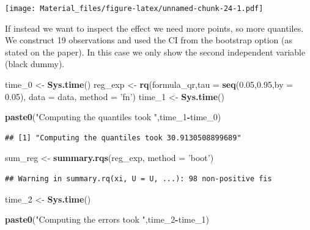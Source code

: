 \documentclass[]{book}
\newenvironment{Shaded}{\begin{snugshade}}{\end{snugshade}}
\newcommand{\KeywordTok}[1]{\textcolor[rgb]{0.13,0.29,0.53}{\textbf{#1}}}
\newcommand{\DataTypeTok}[1]{\textcolor[rgb]{0.13,0.29,0.53}{#1}}
\newcommand{\DecValTok}[1]{\textcolor[rgb]{0.00,0.00,0.81}{#1}}
\newcommand{\FloatTok}[1]{\textcolor[rgb]{0.00,0.00,0.81}{#1}}
\newcommand{\StringTok}[1]{\textcolor[rgb]{0.31,0.60,0.02}{#1}}
\newcommand{\OperatorTok}[1]{\textcolor[rgb]{0.81,0.36,0.00}{\textbf{#1}}}
\newcommand{\NormalTok}[1]{#1}
\begin{document}
\texttt{[image: Material\_files/figure-latex/unnamed-chunk-24-1.pdf]}

If instead we want to inspect the effect we need more points, so more
quantiles. We construct 19 observations and used the CI from the
bootstrap option (as stated on the paper). In this case we only show the
second independent variable (black dummy).

\begin{Shaded}
\begin{Highlighting}[]
\NormalTok{time_}\DecValTok{0}\NormalTok{ <-}\StringTok{ }\KeywordTok{Sys.time}\NormalTok{()}
\NormalTok{reg_exp <-}\StringTok{ }\KeywordTok{rq}\NormalTok{(formula_qr,}\DataTypeTok{tau =} \KeywordTok{seq}\NormalTok{(}\FloatTok{0.05}\NormalTok{,}\FloatTok{0.95}\NormalTok{,}\DataTypeTok{by =} \FloatTok{0.05}\NormalTok{), }\DataTypeTok{data =}\NormalTok{ data, }\DataTypeTok{method =} \StringTok{'fn'}\NormalTok{)}
\NormalTok{time_}\DecValTok{1}\NormalTok{ <-}\StringTok{ }\KeywordTok{Sys.time}\NormalTok{()}

\KeywordTok{paste0}\NormalTok{(}\StringTok{"Computing the quantiles took "}\NormalTok{,time_}\DecValTok{1}\OperatorTok{-}\NormalTok{time_}\DecValTok{0}\NormalTok{)}
\end{Highlighting}
\end{Shaded}

\begin{verbatim}
## [1] "Computing the quantiles took 30.9130508899689"
\end{verbatim}

\begin{Shaded}
\begin{Highlighting}[]
\NormalTok{sum_reg <-}\StringTok{ }\KeywordTok{summary.rqs}\NormalTok{(reg_exp, }\DataTypeTok{method =} \StringTok{'boot'}\NormalTok{)}
\end{Highlighting}
\end{Shaded}

\begin{verbatim}
## Warning in summary.rq(xi, U = U, ...): 98 non-positive fis
\end{verbatim}

\begin{Shaded}
\begin{Highlighting}[]
\NormalTok{time_}\DecValTok{2}\NormalTok{ <-}\StringTok{ }\KeywordTok{Sys.time}\NormalTok{()}

\KeywordTok{paste0}\NormalTok{(}\StringTok{"Computing the errors took "}\NormalTok{,time_}\DecValTok{2}\OperatorTok{-}\NormalTok{time_}\DecValTok{1}\NormalTok{)}
\end{Highlighting}
\end{Shaded}
\end{document}
